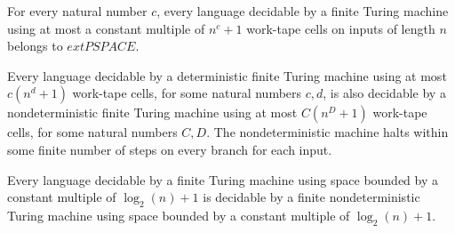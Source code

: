 \begin{theorem}
\label{Complexity.space_poly_subset_PSPACE}
\leanok
{}
For every natural number $c$, every language decidable by a finite Turing machine using
at most a constant multiple of $n^c+1$ work-tape cells on inputs of length $n$ belongs
to $	ext{PSPACE}$.
\end{theorem}

\begin{theorem}
\label{Complexity.PSPACE_subset_NPSPACE}
\leanok
{}
Every language decidable by a deterministic finite Turing machine using at most
$c(n^d+1)$ work-tape cells, for some natural numbers $c,d$, is also decidable by a
nondeterministic finite Turing machine using at most $C(n^D+1)$ work-tape cells, for
some natural numbers $C,D$. The nondeterministic machine halts within some finite number
of steps on every branch for each input.
\end{theorem}

\begin{theorem}
\label{Complexity.LOGSPACE_subset_NL}
\leanok
{}
Every language decidable by a finite Turing machine using space bounded by a constant
multiple of $\log_2(n)+1$ is decidable by a finite nondeterministic Turing machine using
space bounded by a constant multiple of $\log_2(n)+1$.
\end{theorem}
